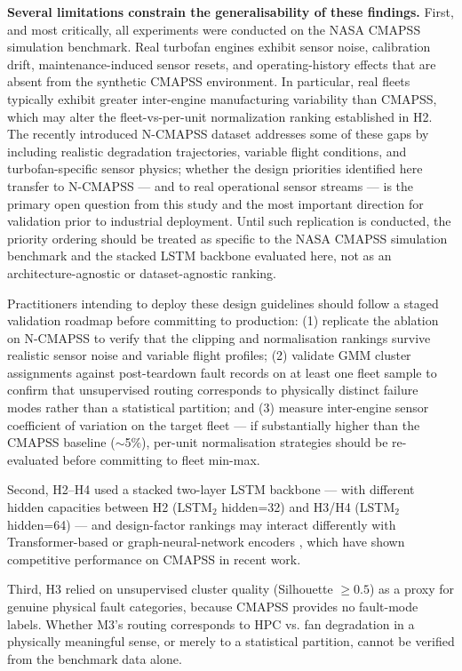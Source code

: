 \documentclass[review,12pt]{elsarticle}
\begin{document}
\textbf{Several limitations constrain the generalisability of these findings.} First, and most critically, all experiments were conducted on the NASA CMAPSS simulation benchmark. Real turbofan engines exhibit sensor noise, calibration drift, maintenance-induced sensor resets, and operating-history effects that are absent from the synthetic CMAPSS environment. In particular, real fleets typically exhibit greater inter-engine manufacturing variability than CMAPSS, which may alter the fleet-vs-per-unit normalization ranking established in H2. The recently introduced N-CMAPSS dataset \cite{ref16} addresses some of these gaps by including realistic degradation trajectories, variable flight conditions, and turbofan-specific sensor physics; whether the design priorities identified here transfer to N-CMAPSS — and to real operational sensor streams — is the primary open question from this study and the most important direction for validation prior to industrial deployment. Until such replication is conducted, the priority ordering should be treated as specific to the NASA CMAPSS simulation benchmark and the stacked LSTM backbone evaluated here, not as an architecture-agnostic or dataset-agnostic ranking.

Practitioners intending to deploy these design guidelines should follow a staged validation roadmap before committing to production: (1) replicate the ablation on N-CMAPSS to verify that the clipping and normalisation rankings survive realistic sensor noise and variable flight profiles; (2) validate GMM cluster assignments against post-teardown fault records on at least one fleet sample to confirm that unsupervised routing corresponds to physically distinct failure modes rather than a statistical partition; and (3) measure inter-engine sensor coefficient of variation on the target fleet --- if substantially higher than the CMAPSS baseline ($\sim$5\%), per-unit normalisation strategies should be re-evaluated before committing to fleet min-max.

Second, H2--H4 used a stacked two-layer LSTM backbone --- with different hidden capacities between H2 (LSTM$_2$ hidden=32) and H3/H4 (LSTM$_2$ hidden=64) --- and design-factor rankings may interact differently with Transformer-based or graph-neural-network encoders \cite{ref08,ref11,ref13,ref14}, which have shown competitive performance on CMAPSS in recent work.

Third, H3 relied on unsupervised cluster quality (Silhouette $\geq 0.5$) as a proxy for genuine physical fault categories, because CMAPSS provides no fault-mode labels. Whether M3's routing corresponds to HPC vs. fan degradation in a physically meaningful sense, or merely to a statistical partition, cannot be verified from the benchmark data alone.
\end{document}
